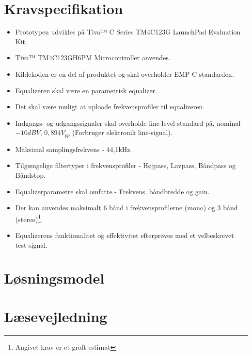 \section{Kravspecifikation} \label{afs:kravspecifikation}
\begin{itemize}
	\item Prototypen udvikles på Tiva™ C Series TM4C123G LaunchPad Evaluation Kit.
	\item Tiva™ TM4C123GH6PM Microcontroller anvendes.
	\item Kildekoden er en del af produktet og skal overholder EMP-C standarden.
	\item Equalizeren skal være en parametrisk equalizer.
	\item Det skal være muligt at uploade frekvensprofiler til equalizeren.
	\item Indgangs- og udgangssignaler skal overholde line-level standard på, nominal $-10 dBV$, $0,894 V_{pp}$ (Forbruger elektronik line-signal).
	\item Maksimal samplingsfrekvens - 44,1kHz.
	\item Tilgængelige filtertyper i frekvensprofiler - Højpass, Lavpass, Båndpass og Båndstop.
	\item Equalizerparametre skal omfatte - Frekvens, båndbredde og gain.
	\item Der kan anvendes maksimalt 6 bånd i frekvensprofilerne (mono) og 3 bånd (stereo)\footnote{Angivet krav er et groft estimat}.   
	\item Equalizerens funktionalitet og effektivitet efterprøves med et velbeskrevet test-signal.
\end{itemize}

\section{Løsningsmodel}

\section{Læsevejledning}
